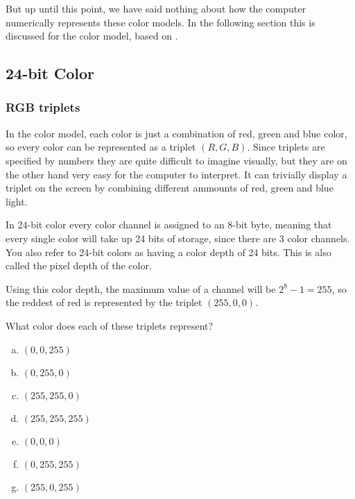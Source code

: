 But up until this point, we have said nothing about how the computer
numerically represents these color models. In the following section
this is discussed for the \rgb color model, based on
\cite{murray1996encyclopedia,neider93:_openg_progr_guide,niederst1999webdesign,sitts2000handbook}.

\subsection{24-bit Color}
\label{sec:24-bit-color}

\subsubsection{RGB triplets}


In the \rgb color model, each color is just a combination of red,
green and blue color, so every color can be represented as a triplet
$(R, G, B)$. Since triplets are specified by numbers they are quite
difficult to imagine visually, but they are on the other hand very
easy for the computer to interpret. It can trivially display a triplet
on the screen by combining different ammounts of red, green and blue
light.

In 24-bit color every color channel is assigned to an 8-bit byte,
meaning that every single color will take up 24 bits of storage, since
there are $3$ color channels. You also refer to 24-bit colors as
having a color depth of 24 bits. This is also called the pixel depth
of the color.

Using this color depth, the maximum value of a channel will be $2^8 -
1 = 255$, so the reddest of red is represented by the triplet
$(255,0,0)$.

\begin{Exercise}[label={rgb-triplet}]
  What color does each of these triplets represent?

  \begin{enumerate}[(a)]
  \item $(0,0,255)$
  \item $(0, 255, 0)$
  \item $(255,255,0)$
  \item $(255,255,255)$
  \item $(0,0,0)$
  \item $(0,255,255)$
  \item $(255,0,255)$

  \end{enumerate}
\end{Exercise}

